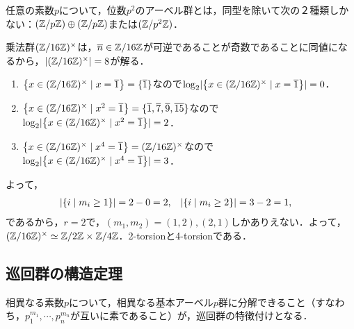 \documentclass[uplatex,dvipdfmx]{jsreport}
\begin{document}
\begin{example}[Kleinの四元群の一般化]\label{example-finite-Abel-group-of-order-p^2}
    任意の素数$p$について，位数$p^2$のアーベル群とは，同型を除いて次の２種類しかない：$(\mathbb{Z}/p\mathbb{Z})\oplus(\mathbb{Z}/p\mathbb{Z})$または$(\mathbb{Z}/p^2\mathbb{Z})$．
\end{example}

\begin{example}[一意性証明の算譜抽出]
    乗法群$(\mathbb{Z}/16\mathbb{Z})^\times$は，$\overline{n}\in\mathbb{Z}/16\mathbb{Z}$が可逆であることが奇数であることに同値になるから，$\lvert(\mathbb{Z}/16\mathbb{Z})^\times\rvert=8$が解る．
    \begin{enumerate}
        \item $\left\{x\in(\mathbb{Z}/16\mathbb{Z})^\times\mid x=\overline{1}\right\}=\{\overline{1}\}$なので$\log_2\lvert\left\{x\in(\mathbb{Z}/16\mathbb{Z})^\times\mid x=\overline{1}\right\}\rvert=0$．
        \item $\left\{x\in(\mathbb{Z}/16\mathbb{Z})^\times\mid x^2=\overline{1}\right\}=\{\overline{1},\overline{7},\overline{9},\overline{15}\}$なので$\log_2\lvert\left\{x\in(\mathbb{Z}/16\mathbb{Z})^\times\mid x^2=\overline{1}\right\}\rvert=2$．
        \item $\left\{x\in(\mathbb{Z}/16\mathbb{Z})^\times\mid x^4=\overline{1}\right\}=(\mathbb{Z}/16\mathbb{Z})^\times$なので$\log_2\lvert\left\{x\in(\mathbb{Z}/16\mathbb{Z})^\times\mid x^4=\overline{1}\right\}\rvert=3$．
    \end{enumerate}
    よって，
    \begin{align*}
        \lvert\left\{i\mid m_i\ge 1\right\}\rvert&=2-0=2,&\lvert\left\{i\mid m_i\ge 2\right\}\rvert&=3-2=1,
    \end{align*}
    であるから，$r=2$で，$(m_1,m_2)=(1,2),(2,1)$しかありえない．よって，$(\mathbb{Z}/16\mathbb{Z})^\times\simeq\mathbb{Z}/2\mathbb{Z}\times\mathbb{Z}/4\mathbb{Z}$．2-torsionと4-torsionである．
\end{example}

\subsection{巡回群の構造定理}

\begin{tcolorbox}[colframe=ForestGreen, colback=ForestGreen!10!white,breakable,colbacktitle=ForestGreen!40!white,coltitle=black,fonttitle=\bfseries\sffamily,
title=]
    相異なる素数$p$について，相異なる基本アーベル$p$群に分解できること（すなわち，$p_1^{m_1},\cdots,p_n^{m_n}$が互いに素であること）が，巡回群の特徴付けとなる．
\end{tcolorbox}
\end{document}
